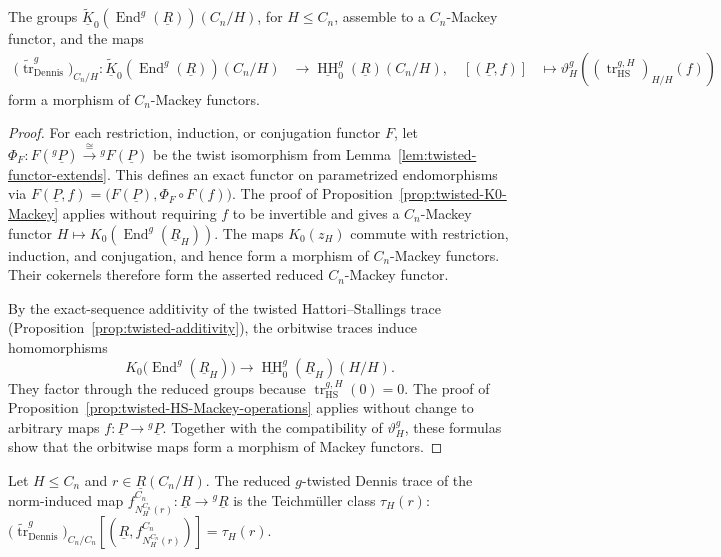 \documentclass[11pt,oneside]{amsart}
\DeclareMathOperator{\HH}{HH}
\DeclareMathOperator{\End}{End}
\DeclareMathOperator{\tr}{tr}
\numberwithin{equation}{section}
\numberwithin{figure}{section}
\theoremstyle{plain}
\theoremstyle{definition}
\theoremstyle{remark}
\begin{document}
\begin{prop}\label{prop:reduced-twisted-Dennis-Mackey}
The groups
\(
\widetilde{\underline K}_0
(\End^g(\underline R))(C_n/H)
\),
for \(H\leq C_n\), assemble to a \(C_n\)-Mackey functor, and the maps
\begin{equation*}
\begin{aligned}
\bigl(\widetilde{\tr}_{\mathrm{Dennis}}^g\bigr)_{C_n/H}\colon
\widetilde{\underline K}_0
(\End^g(\underline R))(C_n/H)
&\longrightarrow
\underline{\HH}_0^g(\underline R)(C_n/H),\quad 
[(\underline P,f)]
&\longmapsto
\vartheta_H^g
\left(
(\tr_{\mathrm{HS}}^{g,H})_{H/H}(f)
\right)
\end{aligned}
\end{equation*}
form a morphism of \(C_n\)-Mackey functors.
\end{prop}

\begin{proof}
For each restriction, induction, or conjugation functor \(F\), let
\(
\Phi_F\colon F({}^g\underline P)\xrightarrow{\cong}{}^gF(\underline P)
\)
be the  twist isomorphism from
Lemma~\ref{lem:twisted-functor-extends}. This defines an exact functor on parametrized endomorphisms via \(F(\underline P,f) = \bigl(F(\underline P),\Phi_F\circ F(f)\bigr)\). The proof of
Proposition~\ref{prop:twisted-K0-Mackey} applies without requiring
\(f\) to be invertible and gives a \(C_n\)-Mackey functor
\(
H\mapsto K_0(\End^g(\underline R_H)).
\)
The maps \(K_0(z_H)\) commute with restriction, induction, and
conjugation, and hence form a morphism of \(C_n\)-Mackey functors.
Their cokernels therefore form the asserted reduced
\(C_n\)-Mackey functor.

By the exact-sequence additivity of the twisted
Hattori--Stallings trace
(Proposition~\ref{prop:twisted-additivity}), the orbitwise traces
induce homomorphisms
\[
K_0\bigl(\End^g(\underline R_H)\bigr)
\longrightarrow
\underline{\HH}_0^g(\underline R_H)(H/H).
\]
They factor through the reduced groups because
\(
\tr_{\mathrm{HS}}^{g,H}(0)=0.
\) 
The proof of
Proposition~\ref{prop:twisted-HS-Mackey-operations} applies without change
to arbitrary maps \(f\colon\underline P\to{}^g\underline P\).
Together with the compatibility of \(\vartheta_H^g\), these formulas
show that the orbitwise maps form a morphism of Mackey functors.
\end{proof}

 


 
 

\begin{prop}\label{prop:teichmuller-as-twisted-Dennis}
Let \(H\leq C_n\) and
\(r\in\underline R(C_n/H)\). The reduced \(g\)-twisted Dennis trace
of the norm-induced map
\(
f_{N_H^{C_n}(r)}^{C_n}\colon
\underline R\to{}^g\underline R
\)
is the Teichm\"uller class \(\tau_H(r)\):
\(
\bigl(\widetilde{\tr}_{\mathrm{Dennis}}^g\bigr)_{C_n/C_n}
\left[
\left(
\underline R,
f_{N_H^{C_n}(r)}^{C_n}
\right)
\right]
=
\tau_H(r).
\)
\end{prop}
\end{document}
